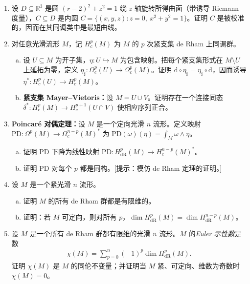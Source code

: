 \documentclass[../../main.tex]{subfiles}
\begin{document}
\begin{enumerate}
\item\label{exercise:ch18-06} 设 $D\subseteq\mathbb{R}^3$ 是圆 $(r-2)^2+z^2=1$ 绕 $z$ 轴旋转所得曲面（带诱导 Riemann 度量），$C\subseteq D$ 是内圆 $C=\{(x,y,z):z=0,\ x^2+y^2=1\}$。证明 $C$ 是被校准的，因而在其同调类中是最短曲线。

\item\label{exercise:ch18-07} 对任意光滑流形 $M$，记 $H^p_c(M)$ 为 $M$ 的 $p$ 次紧支集 de Rham 上同调群。
\begin{enumerate}[(a)]
\item 设 $U\subseteq M$ 为开子集，$\eta:U\hookrightarrow M$ 为包含映射。把每个紧支集形式在 $M\setminus U$ 上延拓为零，定义 $\eta_\sharp:\Omega^p_c(U)\to\Omega^p_c(M)$。证明 $\mathrm{d}\circ\eta_\sharp=\eta_\sharp\circ\mathrm{d}$，因而诱导 $\eta^*:H^p_c(U)\to H^p_c(M)$。
\item \textbf{紧支集 Mayer--Vietoris：}设 $M=U\cup V$。证明存在一个连接同态 $\delta^*:H^p_c(M)\to H^{p+1}_c(U\cap V)$ 使相应序列正合。
\end{enumerate}

\item\label{exercise:ch18-08} \textbf{Poincaré 对偶定理：}设 $M$ 是一个定向光滑 $n$ 流形。定义映射 $\mathrm{PD}:\Omega^p(M)\to\Omega^{n-p}_c(M)^*$ 为 $\mathrm{PD}(\omega)(\eta)=\int_M\omega\wedge\eta$。
\begin{enumerate}[(a)]
\item 证明 $\mathrm{PD}$ 下降为线性映射 $\mathrm{PD}:H^p_{\mathrm{dR}}(M)\to H^{n-p}_c(M)^*$。
\item 证明 $\mathrm{PD}$ 对每个 $p$ 都是同构。[提示：模仿 de Rham 定理的证明。]
\end{enumerate}

\item\label{exercise:ch18-09} 设 $M$ 是一个紧光滑 $n$ 流形。
\begin{enumerate}[(a)]
\item 证明 $M$ 的所有 de Rham 群都是有限维的。
\item 证明：若 $M$ 可定向，则对所有 $p$，$\dim H^p_{\mathrm{dR}}(M)=\dim H^{n-p}_{\mathrm{dR}}(M)$。
\end{enumerate}

\item\label{exercise:ch18-10} 设 $M$ 是一个所有 de Rham 群都有限维的光滑 $n$ 流形。$M$ 的\emph{Euler 示性数}是数
\begin{align*}
\chi(M)=\sum_{p=0}^n(-1)^p\dim H^p_{\mathrm{dR}}(M).
\end{align*}
证明 $\chi(M)$ 是 $M$ 的同伦不变量；并证明当 $M$ 紧、可定向、维数为奇数时 $\chi(M)=0$。
\end{enumerate}
\end{document}
